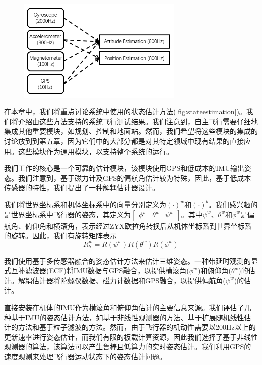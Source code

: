 \documentclass[
  type=master
]{gdutthesis}
\begin{document}
\begin{figure}[htbp]
	\centering
	\includegraphics[width=0.7\textwidth]{state estimation.png}
	\label{fig:stateestimation}
\end{figure} 

在本章中，我们将重点讨论系统中使用的状态估计方法(\autoref{fig:stateestimation})。我们将介绍由这些方法支持的系统飞行测试结果。我们注意到，自主飞行需要仔细地集成其他重要模块，如规划、控制和地面站。然而，我们希望将这些模块的集成的讨论放到到第五章，因为它们中的大部分都是对其特定领域中现有结果的直接应用。这些模块作为通用模块，以支持整个系统的运行。

我们工作的核心是一个可靠的估计模块，该模块使用GPS和低成本的IMU输出姿态。我们注意到，基于磁力计及GPS的偏航角估计较为特殊，因此，基于低成本传感器的特性，我们提出了一种解耦估计器设计。\par
我们将世界坐标系和机体坐标系中的向量分别定义为$(\cdot)^w$和$(\cdot)^b$。我们感兴趣的是世界坐标系中飞行器的姿态，其定义为$\begin{bmatrix}
	\phi^w & \theta^w & \psi^w
\end{bmatrix}$。其中$\psi^w$、$\theta^w$和$\phi^w$是偏航角、俯仰角和横滚角，表示经过ZYX欧拉角转换后从机体坐标系到世界坐标系的旋转。因此，我们有旋转矩阵表示
\begin{equation}\label{eq:rotationmatrix}
	R_{b}^{w}=R(\psi^w)R(\theta^w)R(\phi^w)
\end{equation}\par
我们使用基于多传感器融合的姿态估计方法来估计三维姿态。一种带延时观测的显式互补滤波器(ECF)将IMU数据与GPS融合，以提供横滚角($\phi^w$)和俯仰角($\theta^w$)的估计。解耦估计器将陀螺仪数据、磁力计数据和GPS融合，以提供偏航角($\psi^w$)的估计。

直接安装在机体的IMU作为横滚角和俯仰角估计的主要信息来源。我们评估了几种基于IMU的姿态估计方法，如基于非线性观测器的方法\cite{mahony2008nonlinear}、基于扩展随机线性估计的方法\cite{sabatelli2012double}和基于粒子滤波的方法\cite{cheng2004particle}。然而，由于飞行器的机动性需要以200Hz以上的更新速率进行姿态估计，而我们有限的板载计算资源，因此我们选择了基于非线性观测器的算法，该算法可以产生鲁棒且低算力的实时姿态估计。我们利用GPS的速度观测\cite{hua2010attitude}来处理飞行器运动状态下的姿态估计问题。 
\end{document}
